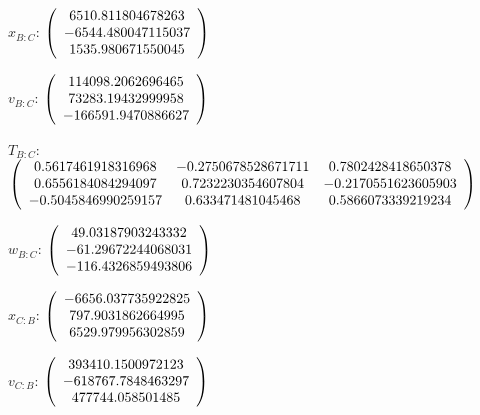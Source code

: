 \begin{description}
$x_{B:C}$: $\left( \begin{array} {ccc} 6510.811804678263 \\    -6544.480047115037 \\     1535.980671550045
\end{array} \right)\\ \\$

$v_{B:C}$:  $\left( \begin{array} {ccc} 114098.2062696465 \\     73283.19432999958 \\    -166591.9470886627
\end{array} \right)\\ \\$

$T_{B:C}$: $\left( \begin{array} {ccc}
0.5617461918316968 &   -0.2750678528671711 &    0.7802428418650378 \\
0.6556184084294097 &    0.7232230354607804 &   -0.2170551623605903 \\
-0.5045846990259157 &     0.633471481045468 &    0.5866073339219234 \\
\end{array} \right)\\ \\$

$w_{B:C}$:  $\left( \begin{array} {ccc} 49.03187903243332 \\    -61.29672244068031 \\    -116.4326859493806
\end{array} \right)\\ \\$

$x_{C:B}$: $\left( \begin{array} {ccc}  -6656.037735922825 \\     797.9031862664995 \\     6529.979956302859
\end{array} \right)\\ \\$

$v_{C:B}$:  $\left( \begin{array} {ccc}  393410.1500972123 \\    -618767.7848463297 \\      477744.058501485
\end{array} \right)\\ \\$


\end{description}
